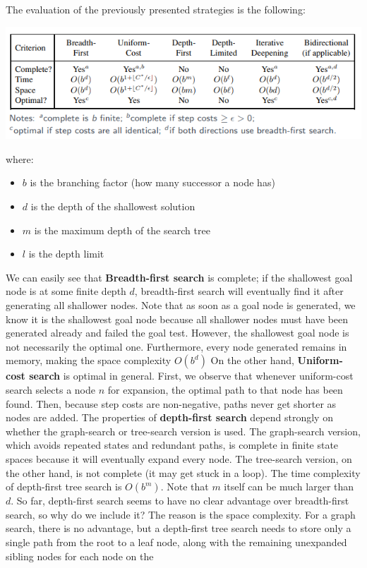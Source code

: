 The evaluation of the previously presented strategies is the following:
\begin{center}
    \includegraphics[]{images/evaluation.png}
\end{center}
where:
\begin{itemize}
    \item $b$ is the branching factor (how many successor a node has)

    \item $d$ is the depth of the shallowest solution

    \item $m$ is the maximum depth of the search tree

    \item $l$ is the depth limit
\end{itemize}
We can easily see that \textbf{Breadth-first search} is complete; if the shallowest goal node is at some finite depth $d$, breadth-first search will eventually find it after generating all shallower nodes. Note that as soon as a goal node is generated, we know it is the shallowest goal node because all shallower nodes must have been generated already
and failed the goal test. However, the shallowest goal node is not necessarily the optimal one. Furthermore, every node generated remains in
memory, making the space complexity $O(b^d)$\newline\newline
On the other hand, \textbf{Uniform-cost search} is optimal in general. First, we observe that whenever uniform-cost search selects a node $n$ for expansion, the optimal path to that node has been found. Then,
because step costs are non-negative, paths never get shorter as nodes are added.\newline\newline
The properties of \textbf{depth-first search} depend strongly on whether the graph-search or tree-search version is used. The graph-search version, which avoids repeated states and redundant paths, is complete in finite state spaces because it will eventually expand every node. The tree-search version, on the other hand, is not complete (it may get stuck in a loop). The time complexity of depth-first tree search is $O(b^m)$. Note that $m$ itself can be much larger than $d$. So far, depth-first search seems to have no clear advantage over breadth-first search, so why do we include it? The reason is the space complexity. For a graph search, there is no advantage, but a depth-first tree search needs to store only a single path from the root to a leaf node, along with the remaining unexpanded sibling nodes for each node on the
